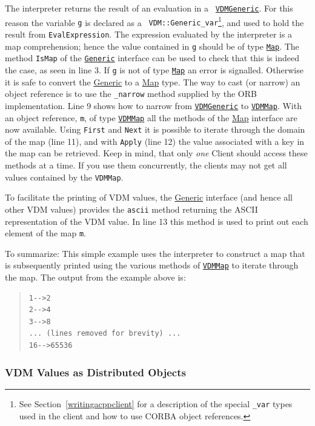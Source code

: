 \documentclass[\pformat,12pt]{article}
\newcommand{\Generic}{\hyperlink{interface.Generic}{Generic}}
\newcommand{\VDMGeneric}{\hyperlink{interface.Generic}{VDMGeneric}}
\newcommand{\VDMMap}{\hyperlink{interface.VDMMap}{VDMMap}}
\newcommand{\Map}{\hyperlink{interface.VDMMap}{Map}}
\begin{document}
The interpreter returns the result of an evaluation in a {\tt
  \VDMGeneric}. For this reason the variable {\tt g} is declared as a {\tt
  VDM::Generic\_var}\footnote{See Section~\ref{writingacppclient} for
  a description of the special {\tt \_var} types used in the client
  and how to use CORBA object references.}, and used to hold the
  result from 
{\tt EvalExpression}. The expression evaluated by the interpreter is a map
comprehension; hence the value contained in {\tt g} should be of type
  {\tt \Map}. 
The method  {\tt IsMap} of the {\tt \Generic} interface can be used to
check that this is indeed the case, as seen in line 3. If {\tt g} is
not of type {\tt \Map} an 
error is signalled. Otherwise it is safe to convert the {\Generic} to a
 {\Map} type. The way to cast (or narrow) an object reference is to use
the {\tt \_narrow} method supplied by the ORB implementation. Line 9
shows how to narrow from {\tt \VDMGeneric} to {\tt \VDMMap}. With an object
reference, {\tt m}, of type  {\tt \VDMMap} all the methods of the {\Map}
interface 
are now available. Using {\tt First} and {\tt Next} it is possible to iterate
through the domain of the map (line 11), and with {\tt Apply} (line 12) the
value associated with a key in the map can be retrieved. 
Keep in mind, that only \emph{one} Client should access these methods
at a time. If you use them concurrently, the clients may not get all
values contained by the {\tt VDMMap}.

To facilitate
the printing of VDM values, the {\Generic} interface (and hence all other
VDM values) provides the {\tt ascii} method returning the ASCII
representation of the VDM value. In line 13 this method is used to
print out each element of the map {\tt m}. 

To summarize: This simple
example uses the interpreter to construct a map that is subsequently
printed using the various methods of {\tt \VDMMap} to iterate through the
map. The output from the example above is: 

\begin{quote}
\begin{verbatim}    
1-->2 
2-->4 
3-->8 
... (lines removed for brevity) ...  
16-->65536
\end{verbatim}
\end{quote}

\subsubsection{VDM Values as Distributed Objects}
\end{document}

